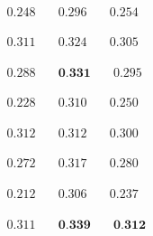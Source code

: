 \newsavebox\embeddiobCNMF
\begin{lrbox}{\embeddiobCNMF}
   $\begin{aligned}
     0.248 & \quad 0.296 & \quad 0.254
    \end{aligned} $
\end{lrbox}

\newsavebox\pcpSF
\begin{lrbox}{\pcpSF}
   $\begin{aligned}
     0.311 & \quad 0.324 & \quad 0.305
    \end{aligned} $
\end{lrbox}

\newsavebox\pcpFoote
\begin{lrbox}{\pcpFoote}
   $\begin{aligned}
     0.288 & \quad \textbf{0.331} & \quad 0.295
    \end{aligned} $
\end{lrbox}

\newsavebox\pcpCNMF
\begin{lrbox}{\pcpCNMF}
   $\begin{aligned}
     0.228 & \quad 0.310 & \quad 0.250
    \end{aligned} $
\end{lrbox}

\newsavebox\tonnetzSF
\begin{lrbox}{\tonnetzSF}
   $\begin{aligned}
     0.312 & \quad 0.312 & \quad 0.300
    \end{aligned} $
\end{lrbox}

\newsavebox\tonnetzFoote
\begin{lrbox}{\tonnetzFoote}
   $\begin{aligned}
     0.272 & \quad 0.317 & \quad 0.280
    \end{aligned} $
\end{lrbox}

\newsavebox\tonnetzCNMF
\begin{lrbox}{\tonnetzCNMF}
   $\begin{aligned}
     0.212 & \quad 0.306 & \quad 0.237
    \end{aligned} $
\end{lrbox}

\newsavebox\cqtSF
\begin{lrbox}{\cqtSF}
   $\begin{aligned}
     0.311 & \quad \textbf{0.339} & \quad \textbf{0.312}
    \end{aligned} $
\end{lrbox}


